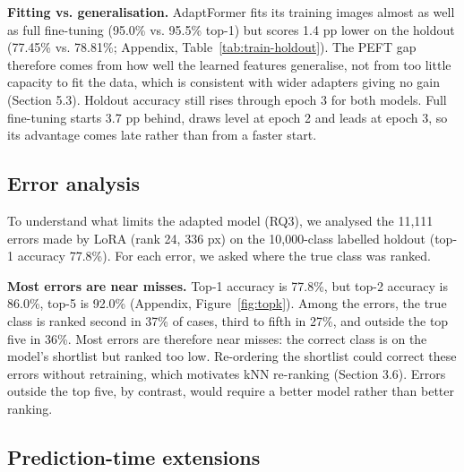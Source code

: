 

\textbf{Fitting vs. generalisation.} AdaptFormer fits its training images almost as well as full fine-tuning (95.0\% vs. 95.5\% top-1) but scores 1.4 pp lower on the holdout (77.45\% vs. 78.81\%; Appendix, Table~\ref{tab:train-holdout}). The PEFT gap therefore comes from how well the learned features generalise, not from too little capacity to fit the data, which is consistent with wider adapters giving no gain (Section 5.3). Holdout accuracy still rises through epoch 3 for both models. Full fine-tuning starts 3.7 pp behind, draws level at epoch 2 and leads at epoch 3, so its advantage comes late rather than from a faster start.

\subsection{Error analysis}\label{error-analysis}

To understand what limits the adapted model (RQ3), we analysed the 11,111 errors made by LoRA (rank 24, 336 px) on the 10,000-class labelled holdout (top-1 accuracy 77.8\%). For each error, we asked where the true class was ranked.

\textbf{Most errors are near misses.} Top-1 accuracy is 77.8\%, but top-2 accuracy is 86.0\%, top-5 is 92.0\% (Appendix, Figure~\ref{fig:topk}). Among the errors, the true class is ranked second in 37\% of cases, third to fifth in 27\%, and outside the top five in 36\%. Most errors are therefore near misses: the correct class is on the model's shortlist but ranked too low. Re-ordering the shortlist could correct these errors without retraining, which motivates kNN re-ranking (Section 3.6). Errors outside the top five, by contrast, would require a better model rather than better ranking.

\subsection{Prediction-time extensions}\label{prediction-time-extensions}

